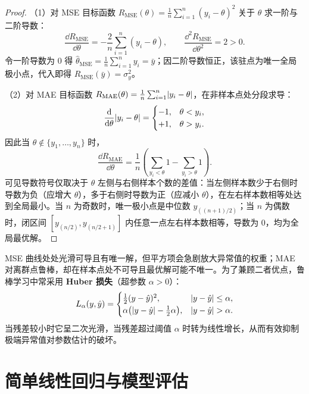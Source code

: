 \begin{proof}
（1）对 MSE 目标函数 $R_{\mathrm{MSE}}(\theta) = \frac{1}{n}\sum_{i=1}^{n}(y_i - \theta)^2$ 关于 $\theta$ 求一阶与二阶导数：
\[
  \frac{\dd R_{\mathrm{MSE}}}{\dd \theta} = -\frac{2}{n}\sum_{i=1}^{n}(y_i - \theta),\qquad
  \frac{\dd^2 R_{\mathrm{MSE}}}{\dd \theta^2} = 2 > 0.
\]
令一阶导数为 $0$ 得 $\hat{\theta}_{\mathrm{MSE}} = \frac{1}{n}\sum_{i=1}^{n}y_i = \bar{y}$；因二阶导数恒正，该驻点为唯一全局极小点，代入即得 $R_{\mathrm{MSE}}(\bar{y}) = \sigma_y^2$。

（2）对 MAE 目标函数 $R_{\mathrm{MAE}}(\theta) = \frac{1}{n}\sum_{i=1}^{n}\lvert y_i - \theta\rvert$，在非样本点处分段求导：
\[
  \frac{\mathop{}\!\mathrm{d}}{\mathop{}\!\mathrm{d} \theta}\lvert y_i - \theta\rvert =
  \begin{cases}
    -1, & \theta < y_i,\\
    +1, & \theta > y_i.
  \end{cases}
\]
因此当 $\theta \notin \{y_1, \dots, y_n\}$ 时，
\[
  \frac{\dd R_{\mathrm{MAE}}}{\dd \theta} = \frac{1}{n}\left(\sum_{y_i < \theta} 1 - \sum_{y_i > \theta} 1\right).
\]
可见导数符号仅取决于 $\theta$ 左侧与右侧样本个数的差值：当左侧样本数少于右侧时导数为负（应增大 $\theta$），多于右侧时导数为正（应减小 $\theta$），在左右样本数相等处达到全局最小。当 $n$ 为奇数时，唯一极小点是中位数 $y_{((n+1)/2)}$；当 $n$ 为偶数时，闭区间 $[y_{(n/2)}, y_{(n/2+1)}]$ 内任意一点左右样本数相等，导数为 $0$，均为全局最优解。
\end{proof}

\begin{remark}\label{rem:huber-loss}
MSE 曲线处处光滑可导且有唯一解，但平方项会急剧放大异常值的权重；MAE 对离群点鲁棒，却在样本点处不可导且最优解可能不唯一。为了兼顾二者优点，鲁棒学习中常采用 \textbf{Huber 损失}（超参数 $\alpha > 0$）：
\begin{equation}\label{eq:huber-loss}
  L_\alpha(y, \hat{y}) =
  \begin{cases}
    \frac{1}{2}(y - \hat{y})^2, & \lvert y - \hat{y}\rvert \le \alpha,\\
    \alpha\bigl(\lvert y - \hat{y}\rvert - \frac{1}{2}\alpha\bigr), & \lvert y - \hat{y}\rvert > \alpha.
  \end{cases}
\end{equation}
当残差较小时它呈二次光滑，当残差超过阈值 $\alpha$ 时转为线性增长，从而有效抑制极端异常值对参数估计的破坏。
\end{remark}

\section{简单线性回归与模型评估}\label{sec:slr}

